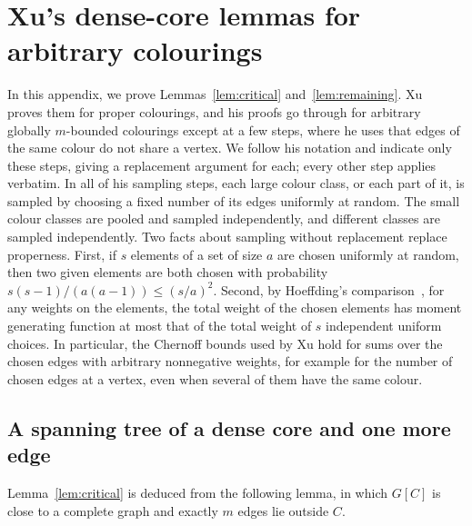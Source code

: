 \appendix
\section{Xu's dense-core lemmas for arbitrary colourings}\label{app:xu}
In this appendix, we prove Lemmas~\ref{lem:critical} and~\ref{lem:remaining}.
Xu~\cite{Xu} proves them for proper colourings, and his proofs go through for arbitrary globally $m$-bounded colourings except at a few steps, where he uses that edges of the same colour do not share a vertex.
We follow his notation and indicate only these steps, giving a replacement argument for each; every other step applies verbatim.
In all of his sampling steps, each large colour class, or each part of it, is sampled by choosing a fixed number of its edges uniformly at random.
The small colour classes are pooled and sampled independently, and different classes are sampled independently.
Two facts about sampling without replacement replace properness.
First, if $s$ elements of a set of size $a$ are chosen uniformly at random, then two given elements are both chosen with probability $s(s-1)/(a(a-1))\le(s/a)^2$.
Second, by Hoeffding's comparison~\cite[Theorem~4]{Hoe}, for any weights on the elements, the total weight of the chosen elements has moment generating function at most that of the total weight of $s$ independent uniform choices.
In particular, the Chernoff bounds used by Xu hold for sums over the chosen edges with arbitrary nonnegative weights, for example for the number of chosen edges at a vertex, even when several of them have the same colour.

\subsection{A spanning tree of a dense core and one more edge}
Lemma~\ref{lem:critical} is deduced from the following lemma, in which $G[C]$ is close to a complete graph and exactly $m$ edges lie outside $C$.

